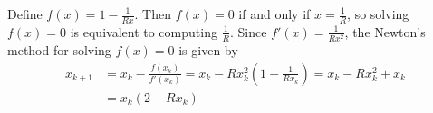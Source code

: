\documentclass{homework}
\begin{document}
\maketitle

\question Define $f(x) = 1 - \frac{1}{Rx}$. Then $f(x) = 0$ if and only if $x = \frac{1}{R}$, so solving $f(x) = 0$ is equivalent to computing $\frac{1}{R}$. Since $f'(x) = \frac{1}{Rx^2}$, the Newton's method for solving $f(x)=0$ is given by
\begin{equation}
	\begin{aligned}
		x_{k+1} &= x_k - \frac{f(x_k)}{f'(x_k)} = x_k - Rx_k^2\left(1-\frac{1}{Rx_k}\right) = x_k - Rx_k^2 +x_k \\
		&= x_k(2- Rx_k)
	\end{aligned}
\end{equation}

\question
\end{document}
